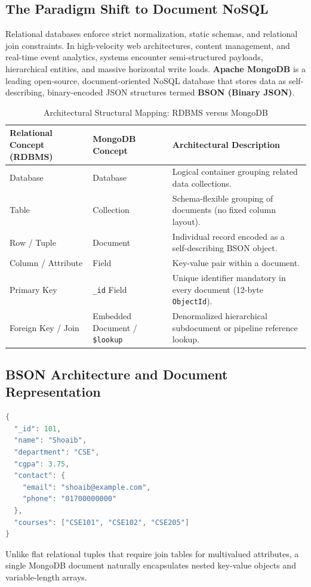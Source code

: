 \subsection{The Paradigm Shift to Document NoSQL}
Relational databases enforce strict normalization, static schemas, and relational join constraints. In high-velocity web architectures, content management, and real-time event analytics, systems encounter semi-structured payloads, hierarchical entities, and massive horizontal write loads. \textbf{Apache MongoDB} is a leading open-source, document-oriented NoSQL database that stores data as self-describing, binary-encoded JSON structures termed \textbf{BSON (Binary JSON)}.

\begin{table}[htbp]
\centering
\small
\caption{Architectural Structural Mapping: RDBMS versus MongoDB}
\label{tab:rdbms_vs_mongodb_mapping}
\begin{tabularx}{\textwidth}{l l X}
\toprule
\textbf{Relational Concept (RDBMS)} & \textbf{MongoDB Concept} & \textbf{Architectural Description} \\
\midrule
Database & Database & Logical container grouping related data collections. \\
Table & Collection & Schema-flexible grouping of documents (no fixed column layout). \\
Row / Tuple & Document & Individual record encoded as a self-describing BSON object. \\
Column / Attribute & Field & Key-value pair within a document. \\
Primary Key & \texttt{\_id} Field & Unique identifier mandatory in every document (12-byte \texttt{ObjectId}). \\
Foreign Key / Join & Embedded Document / \texttt{\$lookup} & Denormalized hierarchical subdocument or pipeline reference lookup. \\
\bottomrule
\end{tabularx}
\end{table}

\subsection{BSON Architecture and Document Representation}
\begin{lstlisting}[language=Java]
{
  "_id": 101,
  "name": "Shoaib",
  "department": "CSE",
  "cgpa": 3.75,
  "contact": {
    "email": "shoaib@example.com",
    "phone": "01700000000"
  },
  "courses": ["CSE101", "CSE102", "CSE205"]
}
\end{lstlisting}
Unlike flat relational tuples that require join tables for multivalued attributes, a single MongoDB document naturally encapsulates nested key-value objects and variable-length arrays.

